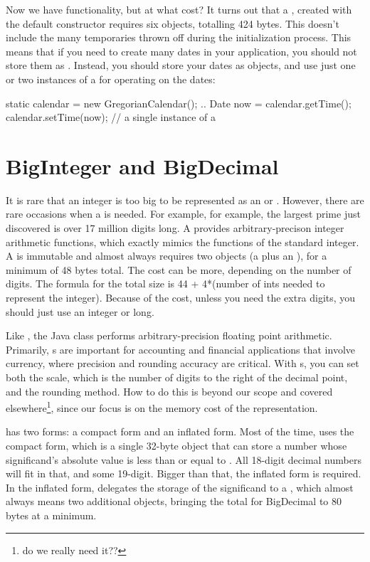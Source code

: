 Now we have functionality, but at what cost? It turns out that a
, created with the default constructor requires six
objects, totalling 424 bytes. This doesn't include the many temporaries
thrown off during the initialization process. This means that if you need to
create many dates in your application, you should not store them as
. Instead, you should store your dates as 
objects, and use just one or two instances of a  for
operating on the dates:

\begin{shortlisting}
     static calendar = new GregorianCalendar();
     ..
	 Date now = calendar.getTime();
	 calendar.setTime(now);   // a single instance of a 
\end{shortlisting}

\section{BigInteger and BigDecimal}

It is rare that an integer is too big to be represented as an  or
. However, there are rare occasions when a   is
needed. For example, for example, the largest prime
just discovered is over 17 million digits long.
A  provides 
arbitrary-precison integer arithmetic functions, which exactly mimics the
functions of the standard integer. 
A  is immutable and almost always requires two objects (a
 plus an ), for a minimum of 48 bytes total.  The
cost can be more, depending on the number of digits.  The formula for the total size is 
44 + 4*(number of ints needed to represent the integer). 
Because of the cost, unless you need the extra digits, you should just use an integer or long.

Like , the Java class  performs
arbitrary-precision floating point arithmetic. Primarily,
s are important for accounting and financial applications that
involve currency, where precision and rounding accuracy are critical. With s,
you can set both the scale, which is the number of digits to the right of the
decimal point, and the rounding method. How to do this is beyond our scope and
covered elsewhere\footnote{do we really need it??}, since our focus is on the
memory cost of the representation.

 has two forms: a compact form and an
inflated form. Most of the time,  uses the compact form,
which is a single 32-byte object that can store a number whose significand's
absolute value is less than or equal to .
All 18-digit decimal numbers will fit in that, and some 19-digit.  Bigger than
that, the inflated form is required. In the inflated form, 
delegates the storage of the significand to a , which almost always means two additional
objects, bringing the total for BigDecimal to 80 bytes at a
minimum.  

